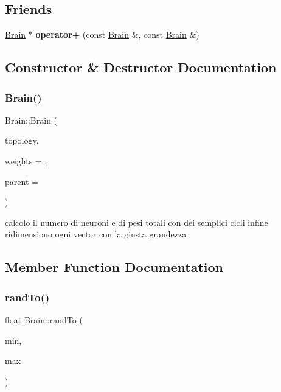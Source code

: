 \subsection*{Friends}
\begin{DoxyCompactItemize}
\item 
\mbox{\label{classBrain_af6f9db04e9c20020c21c7d1e9750b484}} 
\hyperlink{classBrain}{Brain} $\ast$ {\bfseries operator+} (const \hyperlink{classBrain}{Brain} \&, const \hyperlink{classBrain}{Brain} \&)
\end{DoxyCompactItemize}


\subsection{Constructor \& Destructor Documentation}
\mbox{\label{classBrain_ad9637628ba623b059846b435fc11348f}} 
\subsubsection{\texorpdfstring{Brain()}{Brain()}}
{\footnotesize\ttfamily Brain\+::\+Brain (\begin{DoxyParamCaption}\item[{const Q\+Vector$<$ int $>$ \&}]{topology,  }\item[{const Q\+Vector$<$ float $>$ $\ast$}]{weights = {},  }\item[{Q\+Object $\ast$}]{parent = {} }\end{DoxyParamCaption})}

calcolo il numero di neuroni e di pesi totali con dei semplici cicli infine ridimensiono ogni vector con la giusta grandezza

\subsection{Member Function Documentation}
\mbox{\label{classBrain_acb60a16fa86243d358bb64bfaeee91d0}} 
\subsubsection{\texorpdfstring{rand\+To()}{randTo()}}
{\footnotesize\ttfamily float Brain\+::rand\+To (\begin{DoxyParamCaption}\item[{float}]{min,  }\item[{float}]{max }\end{DoxyParamCaption})\hspace{0.3cm}{\ttfamily [static]}}



